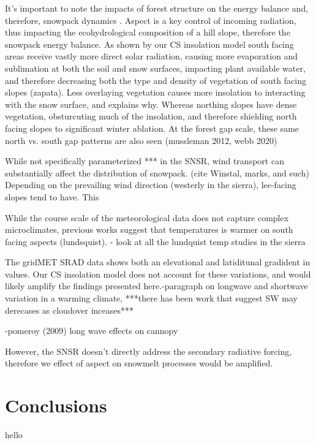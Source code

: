 It's important to note the impacts of forest structure on the energy balance and, therefore, snowpack dynamics \citep{rothForestImpactsSnow2017}. Aspect is a key control of incoming radiation, thus impacting the ecohydrological composition of a hill slope, therefore the snowpack energy balance. As shown by our CS insolation model south facing areas receive vastly more direct solar radiation, causing more evaporation and sublimation at both the soil and snow surfaces, impacting plant available water, and therefore decreasing both the type and density of vegetation of south facing slopes (zapata). Less overlaying vegetation causes more insolation to interacting with the snow surface, and explains why. Whereas northing slopes have dense vegetation, obsturcuting much of the insolation, and therefore shielding north facing slopes to significant winter ablation. At the forest gap scale, these same north vs. south gap patterns are also seen (mussleman 2012, webb 2020)


While not specifically parameterized *** in the SNSR, wind transport can substantially affect the distribution of snowpack. (cite Winstal, marks, and such) Depending on the prevailing wind direction (westerly in the sierra), lee-facing slopes tend to have. This 



While the course scale of the meteorological data does not capture complex microclimates, previous works suggest that temperatures is warmer on south facing aspects (lundsquist). - look at all the lundquist temp studies in the sierra



The gridMET SRAD data shows both an elevational and latiditunal gradident in values. Our CS insolation model does not account for these variations, and would likely amplify the findings presented here.-paragraph on longwave and shortwave variation in a warming climate, ***there has been work that suggest SW may derecases as cloudover inceases***

-pomeroy (2009) long wave effects on cannopy

However, the SNSR doesn’t directly address the secondary radiative forcing, therefore we effect of aspect on snowmelt processes would be amplified.

\hypertarget{ch2-conclusions}{\section{Conclusions}\label{ch2-conclusions}}
hello

\clearpage


